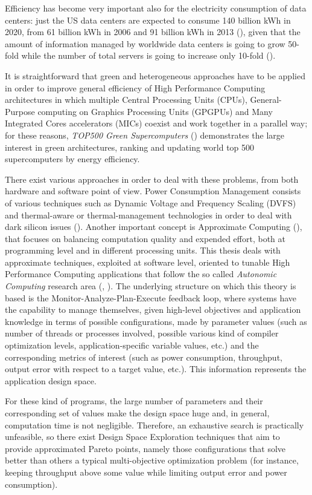Efficiency has become very important also for the electricity consumption of data centers: just the US data centers are expected to consume 140 billion kWh in 2020, from 61 billion kWh in 2006 and 91 billion kWh in 2013 (\cite{site:NRDC2015}), given that the amount of information managed by worldwide data centers is going to grow 50-fold while the number of total servers is going to increase only 10-fold (\cite{gantz2011extracting}).

It is straightforward that green and heterogeneous approaches have to be applied in order to improve general efficiency of High Performance Computing architectures in which multiple Central Processing Units (CPUs), General-Purpose computing on Graphics Processing Units (GPGPUs) and Many Integrated Cores accelerators (MICs) coexist and work together in a parallel way; for these reasons, \textit{TOP500 Green Supercomputers} (\cite{site:topGreen500}) demonstrates the large interest in green architectures, ranking and updating world top 500 supercomputers by energy efficiency.

There exist various approaches in order to deal with these problems, from both hardware and software point of view. Power Consumption Management consists of various techniques such as Dynamic Voltage and Frequency Scaling (DVFS) and ther\-mal-aware or ther\-mal-management technologies in order to deal with dark silicon issues (\cite{mittal2014power}). Another important concept is Approximate Computing (\cite{mittal2016survey}), that focuses on balancing computation quality and expended effort, both at programming level and in different processing units. This thesis deals with approximate techniques, exploited at software level, oriented to tunable High Performance Computing applications that follow the so called \textit{Autonomic Computing} research area (\cite{kephart2003vision}, \cite{computing2006architectural}). The underlying structure on which this theory is based is the Monitor-Analyze-Plan-Execute feedback loop, where systems have the capability to manage themselves, given high-level objectives and application knowledge in terms of possible configurations, made by parameter values (such as number of threads or processes involved, possible various kind of compiler optimization levels, application-specific variable values, etc.) and the corresponding metrics of interest (such as power consumption, throughput, output error with respect to a target value, etc.). This information represents the application design space.

For these kind of programs, the large number of parameters and their corresponding set of values make the design space huge and, in general, computation time is not negligible. Therefore, an exhaustive search is practically unfeasible, so there exist Design Space Exploration techniques that aim to provide approximated Pareto points, namely those configurations that solve better than others a typical multi-objective optimization problem (for instance, keeping throughput above some value while limiting output error and power consumption).

